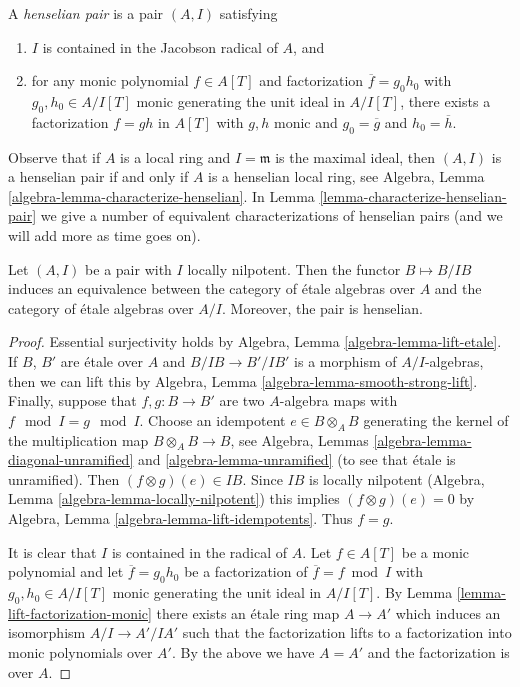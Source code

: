\begin{definition}
\label{definition-henselian-pair}
A {\it henselian pair} is a pair $(A, I)$ satisfying
\begin{enumerate}
\item $I$ is contained in the Jacobson radical of $A$, and
\item for any monic polynomial $f \in A[T]$ and factorization
$\overline{f} = g_0h_0$ with $g_0, h_0 \in A/I[T]$ monic
generating the unit ideal in $A/I[T]$, there
exists a factorization $f = gh$ in $A[T]$ with $g, h$ monic
and $g_0 = \overline{g}$ and $h_0 = \overline{h}$.
\end{enumerate}
\end{definition}

\noindent
Observe that if $A$ is a local ring and $I = \mathfrak m$ is the maximal
ideal, then $(A, I)$ is a henselian pair if and only if $A$ is a henselian
local ring, see
Algebra, Lemma \ref{algebra-lemma-characterize-henselian}.
In Lemma \ref{lemma-characterize-henselian-pair} we give a number of
equivalent characterizations of
henselian pairs (and we will add more as time goes on).

\begin{lemma}
\label{lemma-locally-nilpotent-henselian}
Let $(A, I)$ be a pair with $I$ locally nilpotent. Then the functor
$B \mapsto B/IB$ induces an equivalence between the category of
\'etale algebras over $A$ and the category of \'etale algebras over $A/I$.
Moreover, the pair is henselian.
\end{lemma}

\begin{proof}
Essential surjectivity holds by Algebra, Lemma \ref{algebra-lemma-lift-etale}.
If $B$, $B'$ are \'etale over $A$ and $B/IB \to B'/IB'$ is a morphism
of $A/I$-algebras, then we can lift this by
Algebra, Lemma \ref{algebra-lemma-smooth-strong-lift}.
Finally, suppose that $f, g : B \to B'$ are two $A$-algebra
maps with $f \mod I = g \mod I$. Choose an idempotent $e \in B \otimes_A B$
generating the kernel of the multiplication map $B \otimes_A B \to B$,
see Algebra, Lemmas \ref{algebra-lemma-diagonal-unramified}
and \ref{algebra-lemma-unramified} (to see that \'etale is unramified).
Then $(f \otimes g)(e) \in IB$. Since $IB$ is locally nilpotent
(Algebra, Lemma \ref{algebra-lemma-locally-nilpotent}) this implies
$(f \otimes g)(e) = 0$ by Algebra, Lemma \ref{algebra-lemma-lift-idempotents}.
Thus $f = g$.

\medskip\noindent
It is clear that $I$ is contained in the radical of $A$.
Let $f \in A[T]$ be a monic polynomial and let
$\overline{f} = g_0h_0$ be a factorization
of $\overline{f} = f \bmod I$ with $g_0, h_0 \in A/I[T]$ monic
generating the unit ideal in $A/I[T]$. By
Lemma \ref{lemma-lift-factorization-monic}
there exists an \'etale ring map $A \to A'$ which
induces an isomorphism $A/I \to A'/IA'$ such that
the factorization lifts to a factorization into monic polynomials
over $A'$. By the above we have $A = A'$ and the factorization
is over $A$.
\end{proof}

